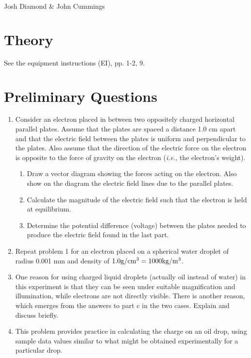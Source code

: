 
\large{\noindent Josh Diamond \& John Cummings}

\section{Theory}

See the equipment instructions (EI), pp. 1-2, 9.

\section{Preliminary Questions}

\begin{enumerate}
\item Consider an electron placed in between two oppositely charged
horizontal parallel plates.  Assume that the plates are spaced a
distance 1.0 cm apart and that the electric field between the plates is
uniform and perpendicular to the plates.  Also assume that the
direction of the electric force on the electron is opposite to the
force of gravity on the electron ({\em i.e.}, the electron's
weight).
	\begin{enumerate}
	\item Draw a vector diagram showing the forces acting on the electron.  Also
show on the diagram the electric field lines due to the parallel plates.
	\item Calculate the magnitude of the electric field such that the electron is
held at equilibrium.
	\item Determine the potential difference (voltage) between the plates needed
to produce the electric field found in the last part.
	\end{enumerate}

\item Repeat problem 1 for an electron placed on a spherical
water droplet of radius 0.001 mm and density of $1.0 {\rm g}/{\rm cm}^3 = 1000 {\rm kg}/{\rm m}^3$.

\item One reason for using charged liquid droplets (actually oil instead of
water) in this experiment is 
that they can be seen under suitable magnification and illumination,
while electrons are not directly visible.  There is another reason,
which emerges from the answers to part c in the two cases. Explain and
discuss briefly.

\item This problem provides practice in calculating the charge on
an oil drop, using sample data values similar to what might be obtained
experimentally for a particular drop.
\end{enumerate}



